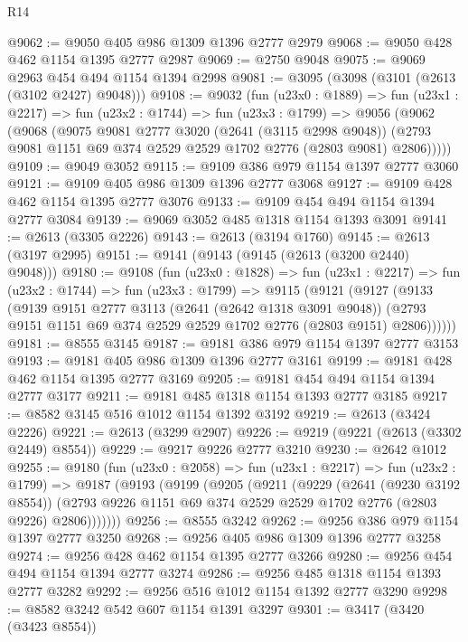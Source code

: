 \begin{lexlean}{R14}
\begin{coremodule}
@9062 := @9050 @405 @986 @1309 @1396 @2777 @2979
@9068 := @9050 @428 @462 @1154 @1395 @2777 @2987
@9069 := @2750 @9048
@9075 := @9069 @2963 @454 @494 @1154 @1394 @2998
@9081 := @3095 (@3098 (@3101 (@2613 (@3102 @2427) @9048)))
@9108 := @9032
    (fun (u23x0 : @1889) =>
    fun (u23x1 : @2217) =>
    fun (u23x2 : @1744) =>
    fun (u23x3 : @1799) =>
    @9056
      (@9062
        (@9068
          (@9075
            @9081
            @2777
            @3020
            (@2641 (@3115 @2998 @9048))
            (@2793 @9081 @1151 @69 @374 @2529 @2529 @1702 @2776 (@2803 @9081) @2806)))))
@9109 := @9049 @3052
@9115 := @9109 @386 @979 @1154 @1397 @2777 @3060
@9121 := @9109 @405 @986 @1309 @1396 @2777 @3068
@9127 := @9109 @428 @462 @1154 @1395 @2777 @3076
@9133 := @9109 @454 @494 @1154 @1394 @2777 @3084
@9139 := @9069 @3052 @485 @1318 @1154 @1393 @3091
@9141 := @2613 (@3305 @2226)
@9143 := @2613 (@3194 @1760)
@9145 := @2613 (@3197 @2995)
@9151 := @9141 (@9143 (@9145 (@2613 (@3200 @2440) @9048)))
@9180 := @9108
    (fun (u23x0 : @1828) =>
    fun (u23x1 : @2217) =>
    fun (u23x2 : @1744) =>
    fun (u23x3 : @1799) =>
    @9115
      (@9121
        (@9127
          (@9133
            (@9139
              @9151
              @2777
              @3113
              (@2641 (@2642 @1318 @3091 @9048))
              (@2793 @9151 @1151 @69 @374 @2529 @2529 @1702 @2776 (@2803 @9151) @2806))))))
@9181 := @8555 @3145
@9187 := @9181 @386 @979 @1154 @1397 @2777 @3153
@9193 := @9181 @405 @986 @1309 @1396 @2777 @3161
@9199 := @9181 @428 @462 @1154 @1395 @2777 @3169
@9205 := @9181 @454 @494 @1154 @1394 @2777 @3177
@9211 := @9181 @485 @1318 @1154 @1393 @2777 @3185
@9217 := @8582 @3145 @516 @1012 @1154 @1392 @3192
@9219 := @2613 (@3424 @2226)
@9221 := @2613 (@3299 @2907)
@9226 := @9219 (@9221 (@2613 (@3302 @2449) @8554))
@9229 := @9217 @9226 @2777 @3210
@9230 := @2642 @1012
@9255 := @9180
    (fun (u23x0 : @2058) =>
    fun (u23x1 : @2217) =>
    fun (u23x2 : @1799) =>
    @9187
      (@9193
        (@9199
          (@9205
            (@9211
              (@9229
                (@2641 (@9230 @3192 @8554))
                (@2793 @9226 @1151 @69 @374 @2529 @2529 @1702 @2776 (@2803 @9226) @2806)))))))
@9256 := @8555 @3242
@9262 := @9256 @386 @979 @1154 @1397 @2777 @3250
@9268 := @9256 @405 @986 @1309 @1396 @2777 @3258
@9274 := @9256 @428 @462 @1154 @1395 @2777 @3266
@9280 := @9256 @454 @494 @1154 @1394 @2777 @3274
@9286 := @9256 @485 @1318 @1154 @1393 @2777 @3282
@9292 := @9256 @516 @1012 @1154 @1392 @2777 @3290
@9298 := @8582 @3242 @542 @607 @1154 @1391 @3297
@9301 := @3417 (@3420 (@3423 @8554))

\end{coremodule}
\end{lexlean}
